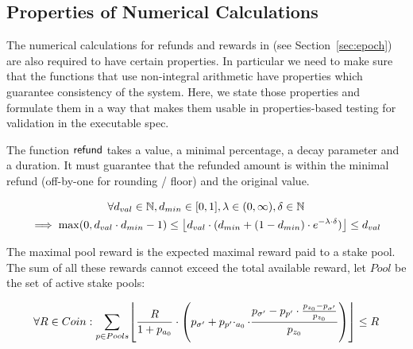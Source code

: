 \subsection{Properties of Numerical Calculations}
\label{sec:prop-numer-calc}

The numerical calculations for refunds and rewards in
(see Section~\ref{sec:epoch}) are also required to have certain properties. In
particular we need to make sure that the functions that use non-integral
arithmetic have properties which guarantee consistency of the system. Here, we
state those properties and formulate them in a way that makes them usable in
properties-based testing for validation in the executable spec.

\begin{property}
  \label{prop:minimal-refund}

  The function $\fun{refund}$ takes a value, a minimal percentage, a decay
  parameter and a duration. It must guarantee that the refunded amount is within
  the minimal refund (off-by-one for rounding / floor) and the original value.

  \begin{multline*}
    \forall d_{val} \in \mathbb{N}, d_{min} \in [0,1], \lambda \in (0, \infty),
    \delta \in \mathbb{N} \\
    \implies \max(0,d_{val}\cdot d_{min} - 1) \leq \floor*{d_{val}\cdot(d_{min} +
      (1-d_{min})\cdot e^{-\lambda\cdot\delta})} \leq d_{val}
  \end{multline*}
\end{property}

\begin{property}
  \label{prop:maximal-pool-reward}

  The maximal pool reward is the expected maximal reward paid to a stake
  pool. The sum of all these rewards cannot exceed the total available reward,
  let $Pool$ be the set of active stake pools:

  \begin{equation*}
    \forall R \in Coin:\sum_{p \in Pools} \floor*{\frac{R}{1+p_{a_{0}}}\cdot
      \left(
        p_{\sigma'}+p_{p'}\cdotp_{a_{0}}\cdot\frac{p_{\sigma'}-p_{p'}\cdot\frac{p_{z_{0}}-p_{\sigma'}}{p_{z_{0}}}}{p_{z_{0}}}
      \right)}\leq R
  \end{equation*}
\end{property}

